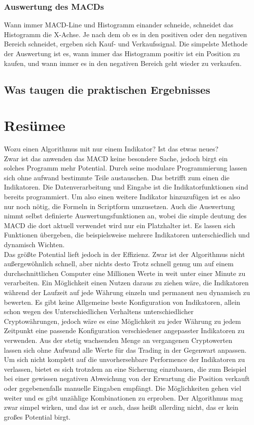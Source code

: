 \documentclass[12pt]{article}
\begin{document}
	\subsubsection{Auswertung des MACDs}
		Wann immer MACD-Line und Histogramm einander schneide, schneidet das Histogramm die X-Achse. Je nach dem ob es in den positiven oder den negativen Bereich schneidet, ergeben sich Kauf- und Verkaufssignal. Die simpelste Methode der Auswertung ist es, wann immer das Histogramm positiv ist ein Position zu kaufen, und wann immer es in den negativen Bereich geht wieder zu verkaufen.


\subsection{Was taugen die praktischen Ergebnisses}
\section{Resümee}
	Wozu einen Algorithmus mit nur einem Indikator? Ist das etwas neues?\\
	Zwar ist das anwenden das MACD keine besondere Sache, jedoch birgt ein solches Programm mehr Potential. Durch seine modulare Programmierung lassen sich ohne aufwand bestimmte Teile austauschen. Das betrifft zum einen die Indikatoren. Die Datenverarbeitung und Eingabe ist die Indikatorfunktionen sind bereits programmiert. Um also einen weitere Indikator hinzuzufügen ist es also nur noch nötig, die Formeln in Scriptform umzusetzen. Auch die Auswertung nimmt selbst definierte Auswertungsfunktionen an, wobei die simple deutung des MACD die dort aktuell verwendet wird nur ein Platzhalter ist. Es lassen sich Funktionen übergeben, die beispielsweise mehrere Indikatoren unterschiedlich und dynamisch Wichten.\\
	Das größte Potential lieft jedoch in der Effizienz. Zwar ist der Algorithmus nicht außergewöhnlich schnell, aber nichts desto Trotz schnell genug um auf einem durchschnittlichen Computer eine Millionen Werte in weit unter einer Minute zu verarbeiten. Ein Möglichkeit einen Nutzen daraus zu ziehen wäre, die Indikatoren während der Laufzeit auf jede Währung einzeln und permanent neu dynamisch zu bewerten. Es gibt keine Allgemeine beste Konfiguration von Indikatoren, allein schon wegen des Unterschiedlichen Verhaltens unterschiedlicher Cryptowährungen, jedoch wäre es eine Möglichkeit zu jeder Währung zu jedem Zeitpunkt eine passende Konfiguration verschiedener angepasster Indikatoren zu verwenden. Aus der stetig wachsenden Menge an vergangenen Cryptowerten lassen sich ohne Aufwand alle Werte für das Trading in der Gegenwart anpassen.\\
	Um sich nicht komplett auf die unvorhersehbare Performence der Indikatoren zu verlassen, bietet es sich trotzdem an eine Sicherung einzubauen, die zum Beispiel bei einer gewissen negativen Abweichung von der Erwartung die Position verkauft oder gegebenenfalls manuelle Eingaben empfängt. Die Möglichkeiten gehen viel weiter und es gibt unzählige Kombinationen zu erproben. Der Algorithmus mag zwar simpel wirken, und das ist er auch, dass heißt allerding nicht, das er kein großes Potential birgt.


\nocite{*}
\printbibliography[heading=bibintoc,title=Literaturverzeichnis,notkeyword={picture}]
\printbibliography[heading=bibintoc,title=Bildverzeichnis,keyword={picture}]
\end{document}
